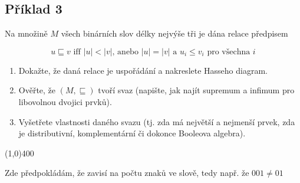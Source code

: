 \documentclass{article}
\begin{document}
\subsection{Příklad 3}
Na množině $M$ všech binárních slov délky nejvýše tři je dána relace předpisem

\[ u \sqsubseteq v \text{ iff } |u| < |v| \text {, anebo }  |u| = |v| \mbox{ a } u_i \leq v_i \text { pro všechna } i \]

\begin{enumerate} 
	\item Dokažte, že daná relace je uspořádání a nakreslete Hasseho diagram.
	\item Ověřte, že $(M,\sqsubseteq)$ tvoří svaz (napište, jak najít supremum a infimum pro libovolnou dvojici prvků).
	\item Vyšetřete vlastnosti daného svazu (tj. zda má největší a nejmenší prvek, zda je distributivní, komplementární či dokonce Booleova algebra).
\end{enumerate}

\line(1,0){400}

Zde předpokládám, že zavisí na počtu znaků ve slově, tedy např. že $001 \neq 01$
\end{document}
